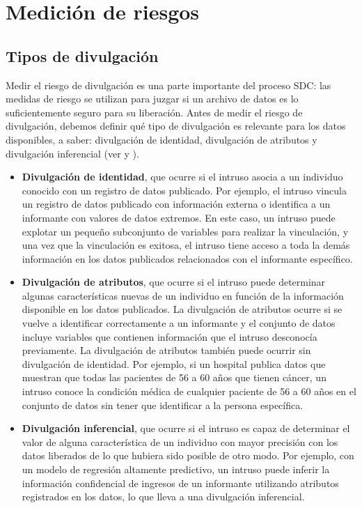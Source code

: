 \documentclass[
]{book}
\theoremstyle{definition}
\theoremstyle{definition}
\theoremstyle{definition}
\theoremstyle{definition}
\theoremstyle{remark}
\begin{document}
\hypertarget{mediciuxf3n-de-riesgos}{%
\chapter{Medición de riesgos}\label{mediciuxf3n-de-riesgos}}

\hypertarget{tipos-de-divulgaciuxf3n}{%
\section{Tipos de divulgación}\label{tipos-de-divulgaciuxf3n}}

Medir el riesgo de divulgación es una parte importante del proceso SDC: las medidas de riesgo se utilizan para juzgar si un archivo de datos es lo suficientemente seguro para su liberación. Antes de medir el riesgo de divulgación, debemos definir qué tipo de divulgación es relevante para los datos disponibles, a saber: divulgación de identidad, divulgación de atributos y divulgación inferencial (ver \citet{lambert1993} y \citet{hundepool2012}).

\begin{itemize}
\item
  \textbf{Divulgación de identidad}, que ocurre si el intruso asocia a un individuo conocido con un registro de datos publicado. Por ejemplo, el intruso vincula un registro de datos publicado con información externa o identifica a un informante con valores de datos extremos. En este caso, un intruso puede explotar un pequeño subconjunto de variables para realizar la vinculación, y una vez que la vinculación es exitosa, el intruso tiene acceso a toda la demás información en los datos publicados relacionados con el informante específico.
\item
  \textbf{Divulgación de atributos}, que ocurre si el intruso puede determinar algunas características nuevas de un individuo en función de la información disponible en los datos publicados. La divulgación de atributos ocurre si se vuelve a identificar correctamente a un informante y el conjunto de datos incluye variables que contienen información que el intruso desconocía previamente. La divulgación de atributos también puede ocurrir sin divulgación de identidad. Por ejemplo, si un hospital publica datos que muestran que todas las pacientes de 56 a 60 años que tienen cáncer, un intruso conoce la condición médica de cualquier paciente de 56 a 60 años en el conjunto de datos sin tener que identificar a la persona específica.
\item
  \textbf{Divulgación inferencial}, que ocurre si el intruso es capaz de determinar el valor de alguna característica de un individuo con mayor precisión con los datos liberados de lo que hubiera sido posible de otro modo. Por ejemplo, con un modelo de regresión altamente predictivo, un intruso puede inferir la información confidencial de ingresos de un informante utilizando atributos registrados en los datos, lo que lleva a una divulgación inferencial.
\end{itemize}
\end{document}
